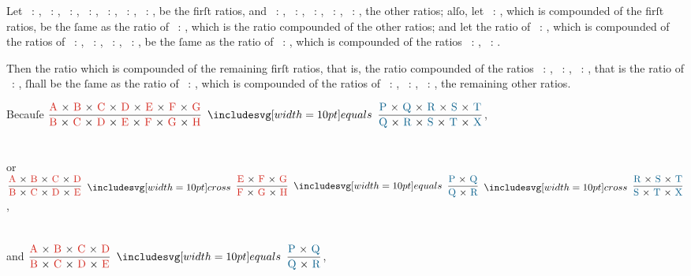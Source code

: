 \documentclass[12pt,preview]{standalone}
\begin{document}
\begin{minipage}{\textwidth}
    \raggedright Let \redA\ : \redB, \redB\ : \redC, \redC\ : \redD, \redD\ : \redE, \redE\ : \redF, \redF\ : \redG, \redG\ : \redH, be the firſt ratios, and \blueP\ : \blueQ, \blueQ\ : \blueR, \blueR\ : \blueS, \blueS\ : \blueT, \blueT\ : \blueX, the other ratios; alſo, let \redA\ : \redH, which is compounded of the firſt ratios, be the ſame as the ratio of \blueP\ : \blueX, which is the ratio compounded of the other ratios; and let the ratio of \redA\ : \redE, which is compounded of the ratios of \redA\ : \redB, \redB\ : \redC, \redC\ : \redD, \redD\ : \redE, be the ſame as the ratio of \blueP\ : \blueR, which is compounded of the ratios \blueP\ : \blueQ, \blueQ\ : \blueR.

    \hfill

    Then the ratio which is compounded of the remaining firſt ratios, that is, the ratio compounded of the ratios \redE\ : \redF, \redF\ : \redG, \redG\ : \redH, that is the ratio of \redE\ : \redH, ſhall be the ſame as the ratio of \blueR\ : \blueX, which is compounded of the ratios of \blueR\ : \blueS, \blueS\ : \blueT, \blueT\ : \blueX, the remaining other ratios.

    \hfill

    \begin{center}
        Becauſe $\dfrac{\text{\redA\ × \redB\ × \redC\ × \redD\ × \redE\ × \redF\ × \redG}}{\text{\redB\ × \redC\ × \redD\ × \redE\ × \redF\ × \redG\ × \redH}} \bequals \dfrac{\text{\blueP\ × \blueQ\ × \blueR\ × \blueS\ × \blueT}}{\text{\blueQ\ × \blueR\ × \blueS\ × \blueT\ × \blueX}}$,\\
        \hfill\\
        \hfill\\
        or $\dfrac{\text{\redA\ × \redB\ × \redC\ × \redD}}{\text{\redB\ × \redC\ × \redD\ × \redE}} \bcross \dfrac{\text{\redE\ × \redF\ × \redG}}{\text{\redF\ × \redG\ × \redH}} \bequals \dfrac{\text{\blueP\ × \blueQ}}{\text{\blueQ\ × \blueR}} \bcross \dfrac{\text{\blueR\ × \blueS\ × \blueT}}{\text{\blueS\ × \blueT\ × \blueX}}$,\\
        \hfill\\
        \hfill\\
        and $\dfrac{\text{\redA\ × \redB\ × \redC\ × \redD}}{\text{\redB\ × \redC\ × \redD\ × \redE}} \bequals \dfrac{\text{\blueP\ × \blueQ}}{\text{\blueQ\ × \blueR}}$,\\
    \end{center}
\end{minipage}

\newpage
\end{document}
